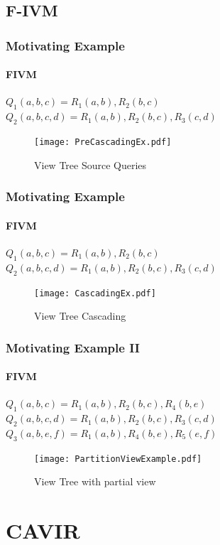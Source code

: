 \documentclass[
	11pt, %
]{beamer}
\begin{document}
\subsection{F-IVM}
\begin{frame}
	\frametitle{Motivating Example}
	\framesubtitle{FIVM}
	$Q_1(a, b, c) = R_1(a,b), R_2(b,c)$\\
	$Q_2(a, b, c, d) = R_1(a,b), R_2(b,c), R_3(c,d)$
		\begin{figure}
		\texttt{[image: PreCascadingEx.pdf]}
		\caption{View Tree Source Queries}
	\end{figure}
\end{frame}
\begin{frame}
	\frametitle{Motivating Example}
	\framesubtitle{FIVM}
	$Q_1(a, b, c) = R_1(a,b), R_2(b,c)$\\
	$Q_2(a, b, c, d) = R_1(a,b), R_2(b,c), R_3(c,d)$
	\begin{figure}
		\texttt{[image: CascadingEx.pdf]}
		\caption{View Tree Cascading}
	\end{figure}
\end{frame}

\begin{frame}
	\frametitle{Motivating Example II}
	\framesubtitle{FIVM}
	$Q_1(a, b, c) = R_1(a,b), R_2(b,c), R_4(b,e)$\\
	$Q_2(a, b, c, d) = R_1(a,b), R_2(b,c), R_3(c,d)$\\
	$Q_3(a,b,e,f) = R_1(a,b), R_4(b,e), R_5(e,f)$
	\begin{figure}
		\texttt{[image: PartitionViewExample.pdf]}
		\caption{View Tree with partial view}
	\end{figure}
\end{frame}


\section{CAVIR}
\end{document}
